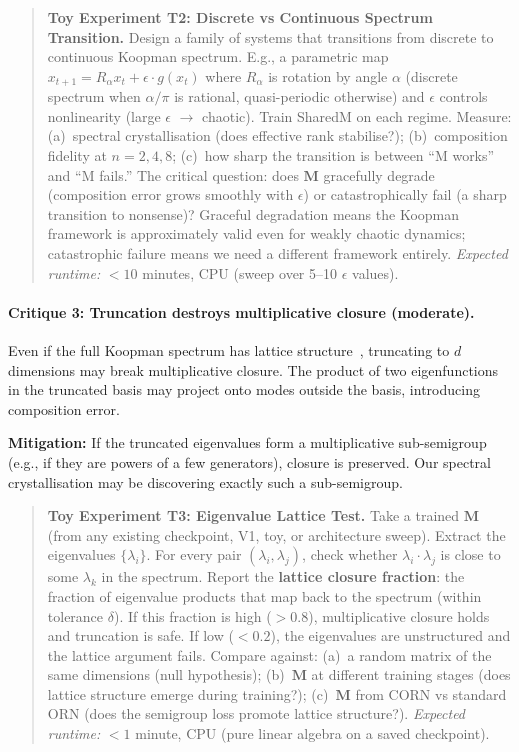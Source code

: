 \documentclass[11pt, a4paper]{article}
\newcommand{\M}{\mathbf{M}}
\theoremstyle{plain}
\theoremstyle{remark}
\begin{document}
\begin{quote}\small
\textbf{Toy Experiment T2: Discrete vs Continuous Spectrum Transition.}
Design a family of systems that transitions from discrete to continuous Koopman spectrum.
E.g., a parametric map $x_{t+1} = R_\alpha x_t + \epsilon \cdot g(x_t)$ where $R_\alpha$ is rotation by angle $\alpha$ (discrete spectrum when $\alpha/\pi$ is rational, quasi-periodic otherwise) and $\epsilon$ controls nonlinearity (large $\epsilon$ $\to$ chaotic).
Train SharedM on each regime.
Measure: (a)~spectral crystallisation (does effective rank stabilise?); (b)~composition fidelity at $n{=}2,4,8$; (c)~how sharp the transition is between ``M works'' and ``M fails.''
The critical question: does $\M$ gracefully degrade (composition error grows smoothly with $\epsilon$) or catastrophically fail (a sharp transition to nonsense)?
Graceful degradation means the Koopman framework is approximately valid even for weakly chaotic dynamics; catastrophic failure means we need a different framework entirely.
\emph{Expected runtime:} $<10$ minutes, CPU (sweep over 5--10 $\epsilon$ values).
\end{quote}

\paragraph{Critique 3: Truncation destroys multiplicative closure (moderate).}
Even if the full Koopman spectrum has lattice structure~\cite{bramburger2025lattice}, truncating to $d$ dimensions may break multiplicative closure.
The product of two eigenfunctions in the truncated basis may project onto modes outside the basis, introducing composition error.

\textbf{Mitigation:} If the truncated eigenvalues form a multiplicative sub-semigroup (e.g., if they are powers of a few generators), closure is preserved.
Our spectral crystallisation may be discovering exactly such a sub-semigroup.

\begin{quote}\small
\textbf{Toy Experiment T3: Eigenvalue Lattice Test.}
Take a trained $\M$ (from any existing checkpoint, V1, toy, or architecture sweep).
Extract the eigenvalues $\{\lambda_i\}$.
For every pair $(\lambda_i, \lambda_j)$, check whether $\lambda_i \cdot \lambda_j$ is close to some $\lambda_k$ in the spectrum.
Report the \textbf{lattice closure fraction}: the fraction of eigenvalue products that map back to the spectrum (within tolerance $\delta$).
If this fraction is high ($>0.8$), multiplicative closure holds and truncation is safe.
If low ($<0.2$), the eigenvalues are unstructured and the lattice argument fails.
Compare against: (a)~a random matrix of the same dimensions (null hypothesis); (b)~$\M$ at different training stages (does lattice structure emerge during training?); (c)~$\M$ from CORN vs standard ORN (does the semigroup loss promote lattice structure?).
\emph{Expected runtime:} $<1$ minute, CPU (pure linear algebra on a saved checkpoint).
\end{quote}
\end{document}
